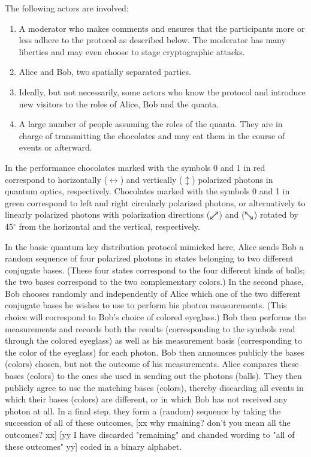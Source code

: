 \documentclass[prb,amssymb,preprint]{revtex4}
\def\ddarrow{{\swarrow\mkern-18mu\nearrow}}
\def\cddarrow{{\searrow\mkern-18mu\nwarrow}}
\begin{document}
The following actors are involved:

\begin{enumerate}

\item A moderator who makes comments and ensures that the participants more
or less adhere to the protocol as described below. The moderator has many
liberties and may even choose to stage cryptographic attacks.

\item Alice and Bob, two spatially separated parties.

\item Ideally, but not necessarily, some actors who know the protocol and
introduce new visitors to the roles of Alice, Bob and the quanta.

\item A large number of people assuming the roles of the quanta. They are in
charge of transmitting the chocolates and may eat them in the course of
events or afterward.

\end{enumerate}

In the performance chocolates marked with the symbols 0 and 1 in red
correspond to horizontally
($\leftrightarrow$) and vertically ($\updownarrow$) polarized photons in
quantum optics, respectively. Chocolates marked with the symbols
0 and 1 in green correspond to left and right circularly polarized
photons, or alternatively to linearly polarized photons with polarization
directions ($\ddarrow$) and ($\cddarrow$) rotated by 45$^\circ$
from the horizontal and the vertical, respectively.

In the basic quantum key distribution protocol mimicked here, Alice sends
Bob a random sequence of four polarized photons in states belonging to two
different conjugate bases. (These four states correspond to the four
different kinds of balls; the two bases correspond to
the two complementary colors.) In the second phase, Bob chooses randomly and
independently of Alice which one of the two different conjugate bases he
wishes to use to perform his photon measurements. (This choice
will correspond to Bob's choice of colored eyeglass.) Bob then performs the
measurements and records both the results (corresponding to the symbols read
through the colored eyeglass) as well as his measurement basis
(corresponding to the color of the eyeglass) for each photon. Bob
then announces publicly the bases (colors) chosen, but not the outcome of
his measurements. Alice compares these bases (colors) to the ones she used
in sending out the photons (balls). They then publicly agree to use the
matching bases (colors), thereby discarding all events in which their bases
(colors) are different, or in which Bob has not received any photon at all.
In a final step, they form a (random) sequence by taking the succession of
all of these outcomes,
[xx why rmaining? don't you mean all the outcomes? xx]
[yy I have discarded "remaining" and chanded wording to "all of these outcomes" yy]
coded in a binary alphabet.
\end{document}
